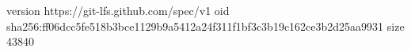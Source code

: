 version https://git-lfs.github.com/spec/v1
oid sha256:ff06dcc5fe518b3bce1129b9a5412a24f311f1bf3c3b19c162ce3b2d25aa9931
size 43840
